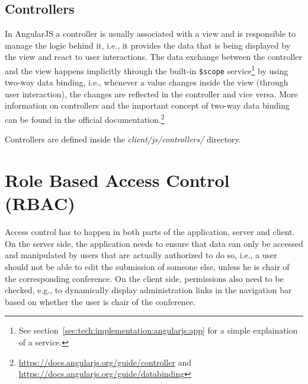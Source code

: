 \documentclass[nochapterpage,nopartpage,noheadingspace,numbersubsubsec,bigchapter,colorback,accentcolor=tud9c,10pt]{tudreport}
\begin{document}
  \subsection{Controllers}
  \label{sec:tech:implementation:angularjs:controllers}

    In AngularJS a controller is usually associated with a view and is responsible to manage the logic behind it, i.e., it provides the data that is being displayed by the view and react to user interactions. The data exchange between the controller and the view happens implicitly through the built-in \texttt{\$scope} service\footnote{See section~\ref{sec:tech:implementation:angularjs:app} for a simple explaination of a service.} by using two-way data binding, i.e., whenever a value changes inside the view (through user interaction), the changes are reflected in the controller and vice versa. More information on controllers and the important concept of two-way data binding can be found in the official documentation.\footnote{\url{https://docs.angularjs.org/guide/controller} and \url{https://docs.angularjs.org/guide/databinding}}

    Controllers are defined inside the \emph{client/js/controllers/} directory.



  \section{Role Based Access Control (RBAC)}
  \label{sec:tech:implementation:rbac}

    Access control has to happen in both parts of the application, server and client. On the server side, the application needs to ensure that data can only be accessed and manipulated by users that are actually authorized to do so, i.e., a user should not be able to edit the submission of someone else, unless he is chair of the corresponding conference. On the client side, permissions also need to be checked, e.g., to dynamically display administration links in the navigation bar based on whether the user is chair of the conference.
\end{document}
